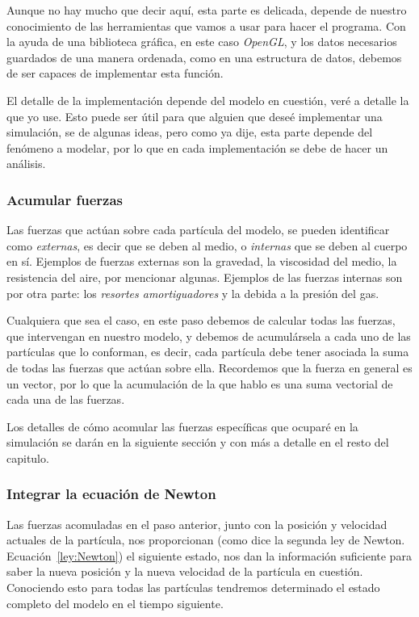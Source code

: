 Aunque no hay mucho que decir aquí, esta parte es delicada, depende de nuestro conocimiento de las herramientas que vamos a usar para hacer el programa.
Con la ayuda de una biblioteca gráfica, en este caso \emph{\foreignlanguage{english}{OpenGL}}, y los datos necesarios guardados de una manera ordenada, como en una estructura de datos, debemos de ser capaces de implementar esta función.

El detalle de la implementación depende del modelo en cuestión, veré a detalle la que yo use.
Esto puede ser útil para que alguien que deseé implementar una simulación, se de algunas ideas, pero como ya dije, esta parte depende del fenómeno a modelar, por lo que en cada implementación se debe de hacer un análisis.

\subsubsection{Acumular fuerzas}
Las fuerzas que actúan sobre cada partícula del modelo, se pueden identificar como \emph{externas}, es decir que se deben al medio, o \emph{internas} que se deben al cuerpo en sí.
Ejemplos de fuerzas externas son la gravedad, la viscosidad del medio, la resistencia del aire, por mencionar algunas.
Ejemplos de las fuerzas internas son por otra parte: los \emph{resortes amortiguadores} y la debida a la presión del gas.

Cualquiera que sea el caso, en este paso debemos de calcular todas las fuerzas, que intervengan en nuestro modelo, y debemos de acumulársela a cada uno de las partículas que lo conforman, es decir, cada partícula debe tener asociada la suma de todas las fuerzas que actúan sobre ella.
Recordemos que la fuerza en general es un vector, por lo que la acumulación de la que hablo es una suma vectorial de cada una de las fuerzas.

Los detalles de cómo acomular las fuerzas específicas que ocuparé en la simulación se darán en la siguiente sección y con más a detalle en el resto del capitulo.

\subsubsection{Integrar la ecuación de Newton}
Las fuerzas acomuladas en el paso anterior, junto con la posición y velocidad actuales de la partícula, nos proporcionan (como dice la segunda ley de Newton. Ecuación~\ref{ley:Newton}) el siguiente estado, nos dan la información suficiente para saber la nueva posición y la nueva velocidad de la partícula en cuestión. 
Conociendo esto para todas las partículas tendremos determinado el estado completo del modelo en el tiempo siguiente.

